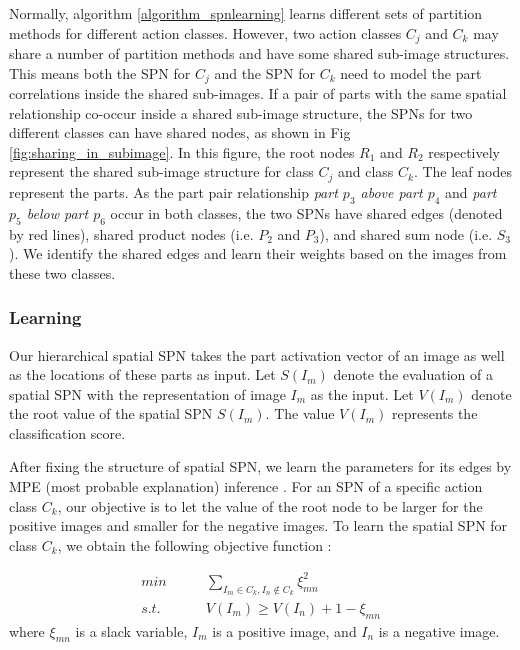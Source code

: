 \documentclass[journal]{IEEEtran}
\begin{document}
Normally, algorithm \ref{algorithm_spnlearning} learns different sets of partition methods for different action classes. However, two action classes $ C_j $ and $ C_k $ may share a number of partition methods and have some shared sub-image structures. This means both the SPN for $ C_j $ and the SPN for $ C_k $ need to model the part correlations inside the shared sub-images. If a pair of parts with the same spatial relationship  co-occur inside a shared sub-image structure, the SPNs for two different classes can have shared nodes, as shown in Fig \ref{fig:sharing_in_subimage}. 
In this figure, the root nodes $ R_1 $ and $ R_2 $ respectively represent the shared sub-image structure for class $ C_j $ and class $ C_k $. The leaf nodes represent the parts.
As the part pair relationship \textit{part $ p_3 $ above part $ p_4 $} and \textit{part $ p_5 $ below part $ p_6 $} occur in both classes, the two SPNs have shared edges (denoted by red lines), shared product nodes (i.e. $ P_2 $ and $ P_3 $), and shared sum node (i.e. $ S_3 $). We identify the shared edges and learn their weights based on the images from these two classes.




\subsubsection{Learning}

Our hierarchical spatial SPN takes the part activation vector of an image as well as the locations of these parts as input. 
Let $ S(I_m) $ denote the evaluation of a spatial SPN with the representation of image $ I_m $ as the input. Let $ V(I_m) $ denote the root value of the spatial SPN $ S(I_m) $.
The value $ V(I_m) $ represents the classification score. 





After fixing the structure of spatial SPN, we learn the parameters for its edges by MPE (most probable explanation) inference \cite{Discriminative_Learning_SPNNIPS2012_4516}. For an SPN of a specific action class $ C_k $, our objective is to let the value of the root node to be larger for the positive images and smaller for the negative images. To learn the spatial SPN for class $ C_k $, we obtain the following objective function :

\begin{equation}\label{Eq:ClassSPNobjectFunction} 
\begin{split}
min \qquad  &\underset{I_m \in C_k, I_n \notin C_k}{\sum} \xi_{mn}^2 \\
 s.t.\qquad &V(I_m) \geq V(I_n)+1-\xi_{mn}
\end{split}
\end{equation}
where $ \xi_{mn} $ is a slack variable, $ I_m $ is a positive image, and $ I_n $ is a negative image.
\end{document}
